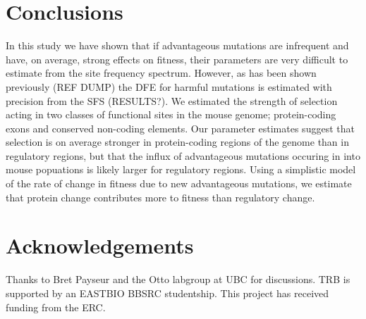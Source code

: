 \documentclass[11pt]{article}
\begin{document}
\section*{Conclusions}

In this study we have shown that if advantageous mutations are infrequent and have, on average, strong effects on fitness, their parameters are very difficult to estimate from the site frequency spectrum. However, as has been shown previously (REF DUMP) the DFE for harmful mutations is estimated with precision from the SFS (RESULTS?). We estimated the strength of selection acting in two classes of functional sites in the mouse genome; protein-coding exons and conserved non-coding elements. Our parameter estimates suggest that selection is on average stronger in protein-coding regions of the genome than in regulatory regions, but that the influx of advantageous mutations occuring in into mouse popuations is likely larger for regulatory regions. Using a simplistic model of the rate of change in fitness due to new advantageous mutations, we estimate that protein change contributes more to fitness than regulatory change.

\section*{Acknowledgements}

Thanks to Bret Payseur and the Otto labgroup at UBC for discussions. TRB is supported by an EASTBIO BBSRC studentship. This project has received funding from the ERC.
\end{document}
